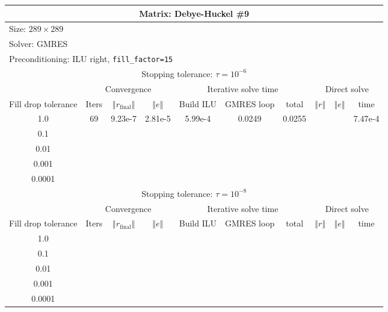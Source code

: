 \documentclass[oneside,final]{amsart}  %
\begin{document}
\begin{tabular}{|c|c|c|c|c|c|c|c|c|c|}
\hline
\multicolumn{10}{|c|}{Matrix: Debye-Huckel \#9}\tabularnewline
\hline
\multicolumn{10}{|l|}{Size: $289\times289$}\tabularnewline
\hline
\multicolumn{10}{|l|}{Solver: GMRES}\tabularnewline
\hline
\multicolumn{10}{|l|}{Preconditioning: ILU right, \texttt{fill\_factor=15}}\tabularnewline
\hline
\hline
\multicolumn{10}{|c|}{Stopping tolerance: $\tau=10^{-6}$}\tabularnewline
\hline
\hline
 & \multicolumn{3}{c|}{Convergence} & \multicolumn{3}{c|}{Iterative solve time} & \multicolumn{3}{c|}{Direct solve}\tabularnewline
\hline
Fill drop tolerance  & Iters & $\left\Vert r_{\text{final}}\right\Vert $  & $\left\Vert e\right\Vert $  & Build ILU  & GMRES loop  & total  & $\left\Vert r\right\Vert $ & $\left\Vert e\right\Vert $  & time\tabularnewline
\hline
1.0 & 69 & 9.23e-7  & 2.81e-5  & 5.99e-4  & 0.0249  & 0.0255  &  &  & 7.47e-4\tabularnewline
\hline
0.1 &  &  &  &  &  &  &  &  & \tabularnewline
\hline
0.01 &  &  &  &  &  &  &  &  & \tabularnewline
\hline
0.001 &  &  &  &  &  &  &  &  & \tabularnewline
\hline
0.0001 &  &  &  &  &  &  &  &  & \tabularnewline
\hline
\hline
\multicolumn{10}{|c|}{Stopping tolerance: $\tau=10^{-8}$}\tabularnewline
\hline
\hline
 & \multicolumn{3}{c|}{Convergence} & \multicolumn{3}{c|}{Iterative solve time} & \multicolumn{3}{c|}{Direct solve }\tabularnewline
\hline
Fill drop tolerance  & Iters  & $\left\Vert r_{\text{final}}\right\Vert $  & $\left\Vert e\right\Vert $ & Build ILU  & GMRES loop  & total  & $\left\Vert r\right\Vert $  & $\left\Vert e\right\Vert $  & time\tabularnewline
\hline
1.0 &  &  &  &  &  &  &  &  & \tabularnewline
\hline
0.1 &  &  &  &  &  &  &  &  & \tabularnewline
\hline
0.01  &  &  &  &  &  &  &  &  & \tabularnewline
\hline
0.001  &  &  &  &  &  &  &  &  & \tabularnewline
\hline
0.0001 &  &  &  &  &  &  &  &  & \tabularnewline
\hline
\end{tabular}
\end{document}
